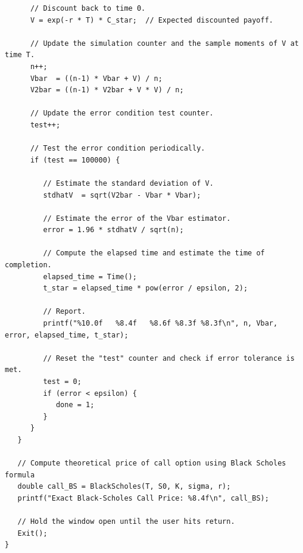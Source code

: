 \documentclass{report}
\begin{document}
\begin{lstlisting}
      // Discount back to time 0.
      V = exp(-r * T) * C_star;  // Expected discounted payoff.

      // Update the simulation counter and the sample moments of V at time T.
      n++;
      Vbar  = ((n-1) * Vbar + V) / n;
      V2bar = ((n-1) * V2bar + V * V) / n;

      // Update the error condition test counter.
      test++;

      // Test the error condition periodically.
      if (test == 100000) {

         // Estimate the standard deviation of V.
         stdhatV  = sqrt(V2bar - Vbar * Vbar);

         // Estimate the error of the Vbar estimator.
         error = 1.96 * stdhatV / sqrt(n);

         // Compute the elapsed time and estimate the time of completion.
         elapsed_time = Time();
         t_star = elapsed_time * pow(error / epsilon, 2);

         // Report.
         printf("%10.0f   %8.4f   %8.6f %8.3f %8.3f\n", n, Vbar, error, elapsed_time, t_star);

         // Reset the "test" counter and check if error tolerance is met.
         test = 0;
         if (error < epsilon) {
            done = 1;
         }
      }
   }

   // Compute theoretical price of call option using Black Scholes formula
   double call_BS = BlackScholes(T, S0, K, sigma, r); 
   printf("Exact Black-Scholes Call Price: %8.4f\n", call_BS);

   // Hold the window open until the user hits return.
   Exit();
}
\end{lstlisting}

\pagebreak
\end{document}
